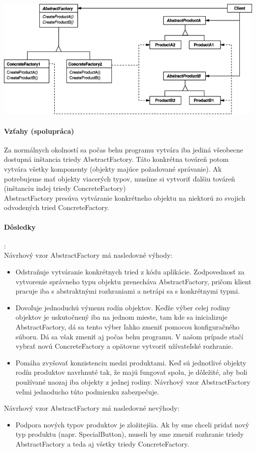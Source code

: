 		\includegraphics[width=.9\textwidth]{images/programovanie/abstractfactory2}

		\paragraph{Vzťahy (spolupráca)}
		Za normálnych okolností sa počas behu programu vytvára iba jediná všeobecne dostupná inštancia triedy AbstractFactory. Táto konkrétna továreň potom vytvára všetky komponenty (objekty majúce požadované správanie). Ak potrebujeme mať objekty viacerých typov, musíme si vytvoriť ďalšiu továreň (inštanciu indej triedy ConcreteFactory)\\
		AbstractFactory presúva vytváranie konkrétneho objektu na niektorú zo svojich odvodených tried ConcreteFactory.


		\paragraph{Dôsledky}:\\
		Návrhový vzor AbstractFactory má nasledovné výhody:
			\begin{itemize}
				\item Odstraňuje vytváranie konkrétnych tried z kódu aplikácie. Zodpovednosť za vytvorenie správneho typu objektu prenecháva AbstractFactory, pričom klient pracuje iba s abstraktnými rozhraniami a netrápi sa s konkrétnymi typmi.
				\item Dovoľuje jednoduchú výmenu rodín objektov. Keďže výber celej rodiny objektov je uskutočnený iba na jednom mieste, tam kde sa inicializuje AbstractFactory, dá sa tento výber ľahko zmeniť pomocou konfiguračného súboru. Dá sa však zmeniť aj počas behu programu. V našom prípade stačí vybrať novú ConcreteFactory a opätovne vytvoriť užívateľské rozhranie.
				\item Pomáha zvyšovať konzistenciu medzi produktami. Keď sú jednotlivé objekty rodín produktov navrhnuté tak, že majú fungovať spolu, je dôležité, aby boli používané naozaj iba objekty z jednej rodiny. Návrhový vzor AbstractFactory veľmi jednoducho túto podmienku zabezpečuje.
			\end{itemize}
		Návrhový vzor AbstractFactory má nasledovné nevýhody:
			\begin{itemize}
				\item Podpora nových typov produktov je zložitejšia. Ak by sme chceli pridať nový typ produktu (napr. SpecialButton), museli by sme zmeniť rozhranie triedy AbstractFactory a teda aj všetky triedy ConcreteFactory.
			\end{itemize}
